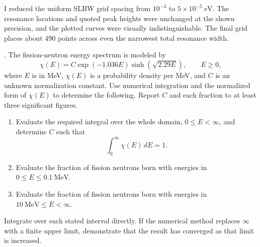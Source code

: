 \begin{adaptedsolution}
I reduced the uniform SLBW grid spacing from $10^{-3}$ to
$5\times10^{-5}~\mathrm{eV}$. The resonance locations and quoted peak
heights were unchanged at the shown precision, and the plotted curves were
visually indistinguishable. The final grid places about 490 points across
even the narrowest total resonance width.
\end{adaptedsolution}

\newpage

. The fission-neutron energy
spectrum is modeled by
\[
 \chi(E)=C\exp(-1.036E)\sinh\!\left(\sqrt{2.29E}\right),
 \qquad E\geq0,
\]
where $E$ is in MeV, $\chi(E)$ is a probability density per MeV, and $C$ is
an unknown normalization constant. Use numerical integration and the
normalized form of $\chi(E)$ to determine the following. Report $C$ and each
fraction to at least three significant figures.

\begin{enumerate}[label=(\alph*)]
\item Evaluate the required integral over the whole domain,
$0\leq E<\infty$, and determine $C$ such that
\[
 \int_0^\infty\chi(E)\,dE=1.
\]
\item Evaluate the fraction of fission neutrons born with energies in
$0\leq E\leq0.1~\mathrm{MeV}$.
\item Evaluate the fraction of fission neutrons born with energies in
$10~\mathrm{MeV}\leq E<\infty$.
\end{enumerate}
Integrate over each stated interval directly. If the numerical method
replaces $\infty$ with a finite upper limit, demonstrate that the result has
converged as that limit is increased.

